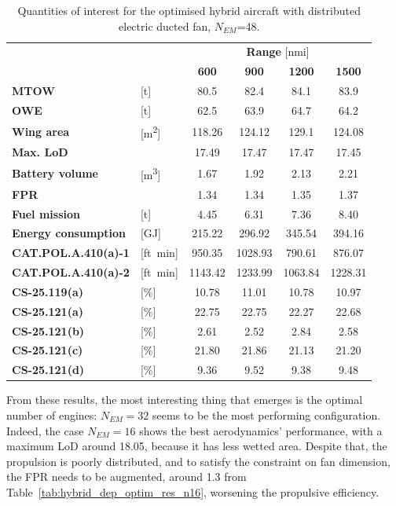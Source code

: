 \begin{table}[!h]
	\centering
	\begin{tabular}{l l c c c c}
		\cline{3-6}
		& & \multicolumn{4}{c}{\textbf{Range} [nmi]} \\
		& & \textbf{600} & \textbf{900} & \textbf{1200} & \textbf{1500} \\
		\hline
		\textbf{MTOW} & [\si{\tonne}] & 80.5 & 82.4 & 84.1 & 83.9 \\
		\textbf{OWE} & [\si{\tonne}] &  62.5 & 63.9 & 64.7 & 64.2 \\
		\textbf{Wing area} & [\si{\square\meter}] & 118.26 & 124.12 & 129.1 & 124.08 \\
		\textbf{Max. LoD} & & 17.49 & 17.47 & 17.47 & 17.45 \\
		\textbf{Battery volume} & [\si{\cubic\meter}] & 1.67 & 1.92 & 2.13 & 2.21 \\
		\textbf{FPR} & & 1.34 & 1.34 & 1.35 & 1.37 \\
		\textbf{Fuel mission} & [\si{\tonne}] & 4.45 & 6.31 & 7.36 & 8.40 \\
		\textbf{Energy consumption} & [\si{\giga\joule}] & 215.22 & 296.92 & 345.54 & 394.16 \\
		\hline
		\textbf{CAT.POL.A.410(a)-1} & [ft\si{\per\minute}] & 950.35 & 1028.93 & 790.61 & 876.07 \\
		\textbf{CAT.POL.A.410(a)-2} & [ft\si{\per\minute}] & 1143.42 & 1233.99 & 1063.84 & 1228.31 \\
		\textbf{CS-25.119(a)} & [\%] & 10.78 & 11.01 & 10.78 & 10.97 \\
		\textbf{CS-25.121(a)} & [\%] & 22.75 & 22.75 & 22.27 & 22.68 \\
		\textbf{CS-25.121(b)} & [\%] & 2.61 & 2.52 & 2.84 & 2.58 \\
		\textbf{CS-25.121(c)} & [\%] & 21.80 & 21.86 & 21.13 & 21.20 \\
		\textbf{CS-25.121(d)} & [\%] & 9.36 & 9.52 & 9.38 & 9.48 \\
		\hline
	\end{tabular}
	\caption{Quantities of interest for the optimised hybrid aircraft with distributed electric ducted fan, $N_{EM}$=48.}
	\label{tab:hybrid_dep_optim_res_n48}
\end{table}
From these results, the most interesting thing that emerges is the optimal number of engines: $N_{EM}=32$ seems to be the most performing configuration. 
Indeed, the case $N_{EM}=16$ shows the best aerodynamics' performance, with a maximum LoD around 18.05, because it has less wetted area. 
Despite that, the propulsion is poorly distributed, and to satisfy the constraint on fan dimension, the FPR needs to be augmented, around 1.3 from Table~\ref{tab:hybrid_dep_optim_res_n16}, worsening the propulsive efficiency. 

